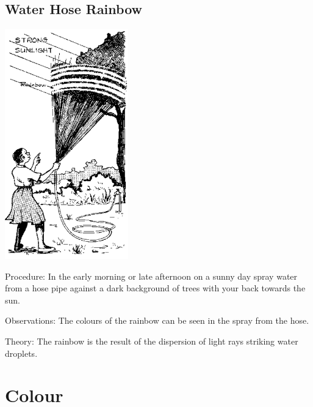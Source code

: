 \begin{multicols}{2}
\subsection{Water Hose Rainbow}

\begin{center}
\includegraphics[width=0.4\textwidth]{./img/source/water-hose-rainbow.png}
\end{center}

\begin{description*}
\item[Procedure:]{In the early morning or late afternoon on a sunny day spray water from a hose pipe against a dark background of trees with your back towards the sun.}
\item[Observations:]{The colours of the rainbow can be seen in the spray from the hose.}
\item[Theory:]{The rainbow is the result of the dispersion of light rays striking water droplets.}
\end{description*}


\section*{Colour}



\end{multicols}
